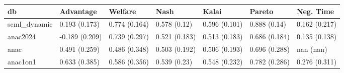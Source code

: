 \begin{tabular}{lllllll}
\toprule
db & Advantage & Welfare & Nash & Kalai & Pareto & Neg. Time \\
\midrule
scml_dynamic & 0.193 (0.173) & 0.774 (0.164) & 0.578 (0.12) & 0.596 (0.101) & 0.888 (0.14) & 0.162 (0.217) \\
anac2024 & -0.189 (0.209) & 0.739 (0.297) & 0.521 (0.183) & 0.513 (0.183) & 0.686 (0.184) & 0.135 (0.138) \\
anac & 0.491 (0.259) & 0.486 (0.348) & 0.503 (0.192) & 0.506 (0.193) & 0.696 (0.288) & nan (nan) \\
anac1on1 & 0.633 (0.385) & 0.586 (0.356) & 0.539 (0.23) & 0.548 (0.232) & 0.782 (0.286) & 0.276 (0.311) \\
\bottomrule
\end{tabular}

